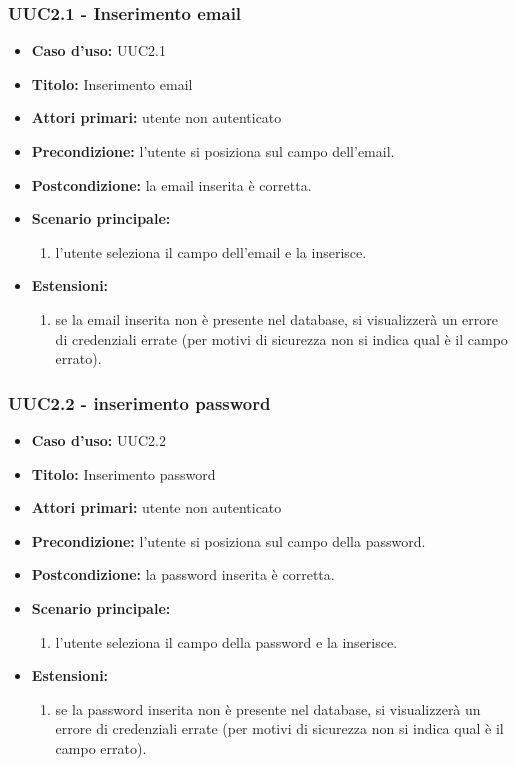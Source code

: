 \documentclass[casi-duso]{subfiles}
\begin{document}
\subsubsection{UUC2.1 - Inserimento email}%
\label{subsub:UUC2.1utente}
\begin{itemize}
  \item \textbf{Caso d’uso:} UUC2.1
  \item \textbf{Titolo:} Inserimento email
  \item \textbf{Attori primari:} utente non autenticato
  \item \textbf{Precondizione:} l'utente si posiziona sul campo dell'email.
  \item \textbf{Postcondizione:} la email inserita è corretta.
  \item \textbf{Scenario principale:}
        \begin{enumerate}
          \item l'utente seleziona il campo dell'email e la inserisce.
        \end{enumerate}
  \item \textbf{Estensioni:}
        \begin{enumerate}
          \item se la email inserita non è presente nel database, si visualizzerà un errore di credenziali errate (per motivi di sicurezza
                non si indica qual è il campo errato).
        \end{enumerate}
\end{itemize}

\subsubsection{UUC2.2 - inserimento password}%
\label{subsub:UUC2.2utente}
\begin{itemize}
  \item \textbf{Caso d’uso:} UUC2.2
  \item \textbf{Titolo:} Inserimento password
  \item \textbf{Attori primari:} utente non autenticato
  \item \textbf{Precondizione:} l'utente si posiziona sul campo della password.
  \item \textbf{Postcondizione:} la password inserita è corretta.
  \item \textbf{Scenario principale:}
        \begin{enumerate}
          \item l'utente seleziona il campo della password e la inserisce.
        \end{enumerate}
  \item \textbf{Estensioni:}
        \begin{enumerate}
          \item se la password inserita non è presente nel database, si visualizzerà un errore di credenziali errate (per motivi di sicurezza
                non si indica qual è il campo errato).
        \end{enumerate}
\end{itemize}
\end{document}
